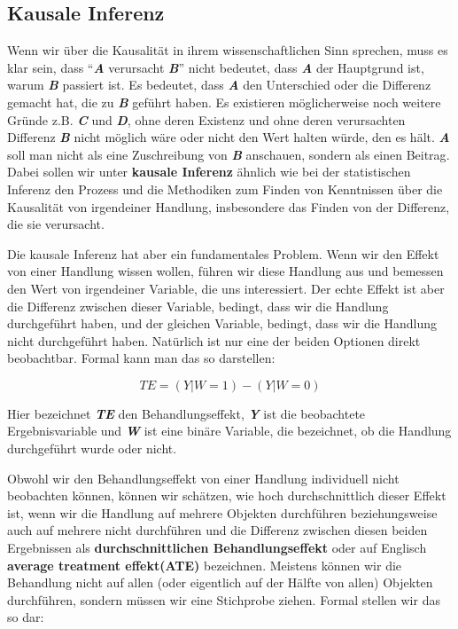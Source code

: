 \documentclass[12pt,a4paper,twoside]{scrartcl}
\numberwithin{equation}{section}
\begin{document}
  	\subsection{Kausale Inferenz}\label{subsec:kausalität}
  	Wenn wir über die Kausalität in ihrem wissenschaftlichen Sinn sprechen, muss es klar sein, dass \enquote{\textbf{\textit{A}} verursacht \textbf{\textit{B}}} nicht bedeutet, dass \textbf{\textit{A}} der Hauptgrund ist, warum \textbf{\textit{B}} passiert ist. Es bedeutet, dass \textbf{\textit{A}} den Unterschied oder die Differenz gemacht hat, die zu \textbf{\textit{B}} geführt haben. Es existieren möglicherweise noch weitere Gründe z.B. \textbf{\textit{C}} und \textbf{\textit{D}}, ohne deren Existenz und ohne deren verursachten Differenz \textbf{\textit{B}} nicht möglich wäre oder nicht den Wert halten würde, den es hält. \textbf{\textit{A}} soll man nicht als eine Zuschreibung von \textbf{\textit{B}} anschauen, sondern als einen Beitrag\cite{MacHum}.  Dabei sollen wir unter \textbf{kausale Inferenz} ähnlich wie bei der statistischen Inferenz den Prozess und die Methodiken zum Finden von Kenntnissen über die Kausalität von irgendeiner Handlung, insbesondere das Finden von der Differenz, die sie verursacht.\par
  	

\noindent	
Die kausale Inferenz hat aber ein fundamentales Problem. Wenn wir den Effekt von einer Handlung wissen wollen, führen wir diese Handlung aus und bemessen den Wert von irgendeiner Variable, die uns interessiert. Der echte Effekt ist aber die Differenz zwischen dieser Variable, bedingt, dass wir die Handlung durchgeführt haben, und der gleichen Variable, bedingt, dass wir die Handlung nicht durchgeführt haben\cite{holland1986statistics}. Natürlich ist nur eine der beiden Optionen direkt beobachtbar. Formal kann man das so darstellen: \par
  	
\begin{equation}
  TE = (Y|W = 1) - (Y|W = 0)
\end{equation}  	
  	
\noindent	  	
Hier bezeichnet \textbf{\textit{TE}} den Behandlungseffekt, \textbf{\textit{Y}} ist die beobachtete Ergebnisvariable und \textbf{\textit{W}} ist eine binäre Variable, die bezeichnet, ob die Handlung durchgeführt wurde oder nicht.\par

\noindent	  	
Obwohl wir den Behandlungseffekt von einer Handlung individuell nicht beobachten können, können wir schätzen, wie hoch durchschnittlich dieser Effekt ist, wenn wir die Handlung auf mehrere Objekten durchführen beziehungsweise auch auf mehrere nicht durchführen und die Differenz zwischen diesen beiden Ergebnissen als \textbf{durchschnittlichen Behandlungseffekt} oder auf Englisch \textbf{average treatment effekt(ATE)} bezeichnen. Meistens können wir die Behandlung nicht auf allen (oder eigentlich auf der Hälfte von allen) Objekten durchführen, sondern müssen wir eine Stichprobe ziehen.  Formal stellen wir das so dar: \par
\end{document}
